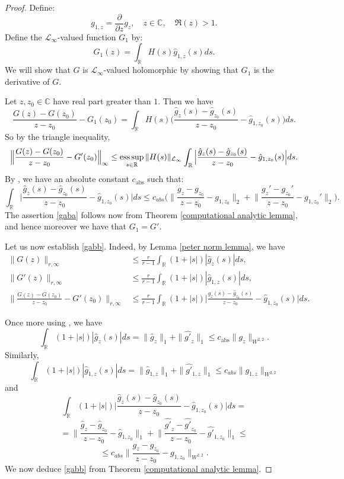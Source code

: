     \begin{proof} 
        Define:
        $$g_{1,z}=\frac{\partial}{\partial z}g_z,\quad z\in\mathbb{C},\quad \Re(z)>1.$$
        Define the $\mathcal{L}_\infty$-valued function $G_1$ by:
        \begin{equation*}
            G_1(z)=\int_{\mathbb{R}}H(s)\hat{g}_{1,z}(s)ds.
        \end{equation*}
        We will show that $G$ is $\mathcal{L}_\infty$-valued holomorphic by showing that $G_1$ is the derivative of $G$.

        Let $z,z_0 \in \mathbb{C}$ have real part greater than $1$. Then we have
        \begin{equation*}
            \frac{G(z)-G(z_0)}{z-z_0}-G_1(z_0) = \int_{\mathbb{R}}H(s)\Big(\frac{\hat{g}_z(s)-\hat{g}_{z_0}(s)}{z-z_0}-\hat{g}_{1,z_0}(s)\Big)ds.
        \end{equation*}
        So by the triangle inequality,
        $$\Big\|\frac{G(z)-G(z_0)}{z-z_0}-G'(z_0)\Big\|_{\infty}\leq\operatorname*{ess\,sup}_{s \in \mathbb{R}}\|H(s)\|_{\mathcal{L}_\infty}\int_{\mathbb{R}}\Big|\frac{\hat{g}_z(s)-\hat{g}_{z_0}(s)}{z-z_0}-\hat{g}_{1,z_0}(s)\Big|ds.$$
        By \cite[Lemma 7]{PS-crelle}, we have an absolute constant $c_{\mathrm{abs}}$ such that:
        $$\int_{\mathbb{R}}\Big|\frac{\hat{g}_z(s)-\hat{g}_{z_0}(s)}{z-z_0}-\hat{g}_{1,z_0}(s)\Big|ds\leq c_{abs}\Big(\Big\|\frac{g_z-g_{z_0}}{z-z_0}-g_{1,z_0}\Big\|_2+\Big\|\frac{g_z'-g_{z_0}'}{z-z_0}-g_{1,z_0}'\Big\|_2\Big).$$
        The assertion \eqref{gaba} follows now from Theorem \ref{computational analytic lemma}, and hence moreover we have that $G_1 = G'$.

        Let us now establish \eqref{gabb}. Indeed, by Lemma \ref{peter norm lemma}, we have
        \begin{align*}
                                                \|G(z)\|_{r,\infty}  &\leq \frac{r}{r-1}\int_{\mathbb{R}}(1+|s|)|\hat{g}_z(s)|ds,\\
                                                \|G'(z)\|_{r,\infty} &\leq \frac{r}{r-1}\int_{\mathbb{R}}(1+|s|)|\hat{g}_{1,z}(s)|ds,\\
            \Big\|\frac{G(z)-G(z_0)}{z-z_0}-G'(z_0)\Big\|_{r,\infty} &\leq \frac{r}{r-1}\int_{\mathbb{R}}(1+|s|)\Big|\frac{\hat{g}_z(s)-\hat{g}_{z_0}(s)}{z-z_0}-\hat{g}_{1,z_0}(s)\Big|ds.
        \end{align*}

        Once more using \cite[Lemma 7]{PS-crelle}, we have
        $$\int_{\mathbb{R}}(1+|s|)|\hat{g}_z(s)|ds=\|\hat{g}_z\|_1+\|\hat{g'}_z\|_1\leq c_{\mathrm{abs}}\|g_z\|_{W^{2,2}}.$$
        Similarly,
        $$\int_{\mathbb{R}}(1+|s|)|\hat{g}_{1,z}(s)|ds=\|\hat{g}_{1,z}\|_1+\|\hat{g'}_{1,z}\|_1\leq c_{abs}\|g_{1,z}\|_{W^{2,2}}$$
        and
        $$\int_{\mathbb{R}}(1+|s|)\Big|\frac{\hat{g}_z(s)-\hat{g}_{z_0}(s)}{z-z_0}-\hat{g}_{1,z_0}(s)\Big|ds=$$
        $$=\Big\|\frac{\hat{g}_z-\hat{g}_{z_0}}{z-z_0}-\hat{g}_{1,z_0}\Big\|_1+\Big\|\frac{\hat{g'}_z-\hat{g'}_{z_0}}{z-z_0}-\hat{g'}_{1,z_0}\Big\|_1\leq$$
        $$\leq c_{abs}\Big\|\frac{g_z-g_{z_0}}{z-z_0}-g_{1,z_0}\Big\|_{W^{2,2}}.$$
        We now deduce \eqref{gabb} from Theorem \ref{computational analytic lemma}.   
    \end{proof}

